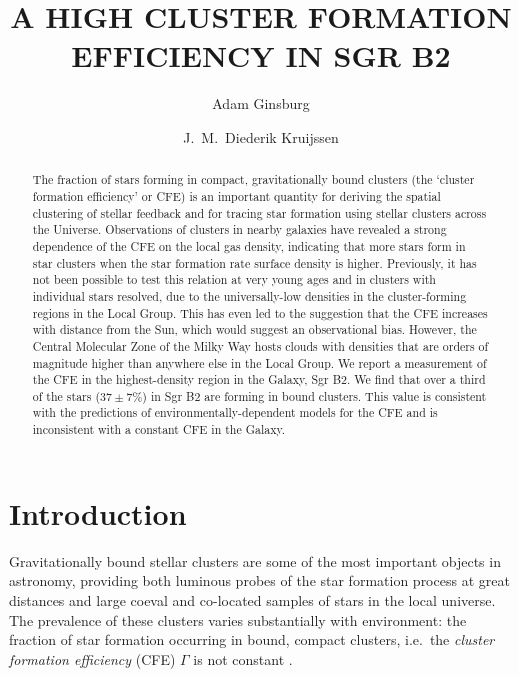 \documentclass[twocolumn]{aastex62}
\begin{document}
\title{A HIGH CLUSTER FORMATION EFFICIENCY IN SGR B2}


\author{Adam Ginsburg}

\author{J.~M.\ Diederik Kruijssen}



\begin{abstract}
    The fraction of stars forming in compact, gravitationally bound clusters (the `cluster formation efficiency' or CFE) is
    an important quantity for deriving the spatial clustering of stellar feedback and for tracing star formation using stellar clusters across the Universe.
    Observations of clusters in nearby galaxies have revealed a strong dependence
    of the CFE on the local gas density, indicating
    that more stars form in star clusters when the star formation
    rate surface density is higher. Previously, it has not been possible to test this relation
    at very young ages and in clusters with individual stars resolved, due to the universally-low densities in the cluster-forming regions in the
    Local Group. This has even led to the suggestion that the CFE increases with distance from the Sun, which would suggest an observational bias. However, the Central Molecular Zone of the Milky Way hosts clouds with densities that are orders of magnitude higher than anywhere else in the Local
    Group.  We report a measurement of the CFE in the highest-density region in the Galaxy, Sgr B2.  We find
    that over a third of the stars ($37\pm7\%$) in Sgr B2 are forming in bound
    clusters. This value is consistent with the predictions of environmentally-dependent models for the CFE and is inconsistent with a constant CFE in the Galaxy.\vspace{10mm}
\end{abstract}


\section{Introduction}
Gravitationally bound stellar clusters are some of the most important objects
in astronomy, providing both luminous probes of the star formation process at
great distances \citep[e.g.,][among many others]{Brodie2006a,Adamo2013a,Kruijssen2018b,Kruijssen2018a} and large coeval
and co-located samples of stars in the local universe.  The prevalence of these
clusters varies substantially with environment: the fraction of star formation occurring in bound, compact clusters, i.e.~the \emph{cluster formation
efficiency} (CFE) $\Gamma$ is not constant \citep{Adamo2015a,Johnson2016a,Messa2018a}.
\end{document}
